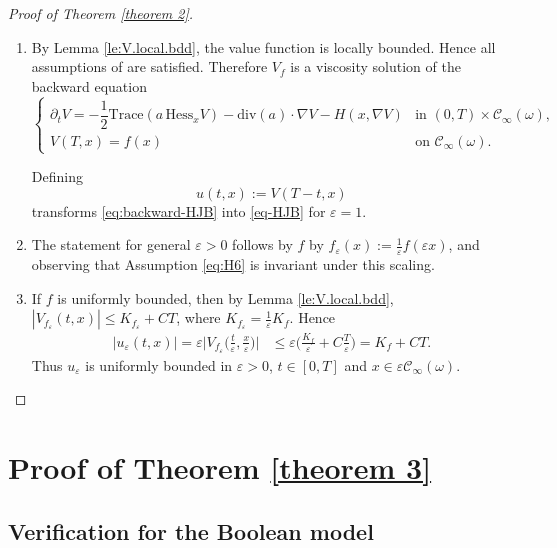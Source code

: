 \documentclass[11pt]{article}
\newcommand{\eps}{\varepsilon}
\theoremstyle{rem}
\begin{document}
\begin{proof}[Proof of Theorem \ref{theorem 2}]
\begin{enumerate}

\item
By Lemma \ref{le:V.local.bdd}, the value function is locally bounded. Hence all assumptions of \cite[Theorem 7.4]{T13} are satisfied. Therefore $V_f$ is a viscosity solution of the backward equation
\begin{equation}\label{eq:backward-HJB}
\begin{cases}
\partial_tV
=
-\dfrac12
\mathrm{Trace}(a\,\mathrm{Hess}_xV)
-
\mathrm{div}(a)\cdot\nabla V
-
H(x,\nabla V)
&
\text{in }
(0,T)\times\mathcal C_\infty(\omega),
\\[0.3em]
V(T,x)=f(x)
&
\text{on }
\mathcal C_\infty(\omega).
\end{cases}
\end{equation}

Defining
\[
u(t,x):=V(T-t,x)
\]
transforms \eqref{eq:backward-HJB} into \eqref{eq-HJB} for $\eps=1$.

\item
The statement for general $\eps>0$ follows by  $f$ by 
$f_\eps(x):=\frac1\eps f(\eps x)$, and observing that Assumption \eqref{eq:H6} is invariant under this scaling.

\item
If $f$ is uniformly bounded, then by Lemma \ref{le:V.local.bdd},
$|V_{f_\eps}(t,x)|
\leq
K_{f_\eps}+CT$,
where $K_{f_\eps}
=
\frac1\eps K_f$. Hence
\[
\begin{aligned}
|u_\eps(t,x)|
=
\eps
\bigg|
V_{f_\eps}
\bigg(
\frac t\eps,
\frac x\eps
\bigg)
\bigg|
&\leq
\eps
\bigg(
\frac{K_f}{\eps}
+
C\frac T\eps
\bigg)
=
K_f+CT.
\end{aligned}
\]
Thus $u_\eps$ is uniformly bounded in $\eps>0$, 
$t\in[0,T]$ and $x\in\eps\mathcal C_\infty(\omega)$.
\end{enumerate}
\end{proof}







\section{Proof of Theorem \ref{theorem 3}}
\label{sec proof thm3}

\subsection{Verification for the Boolean model}
\end{document}
